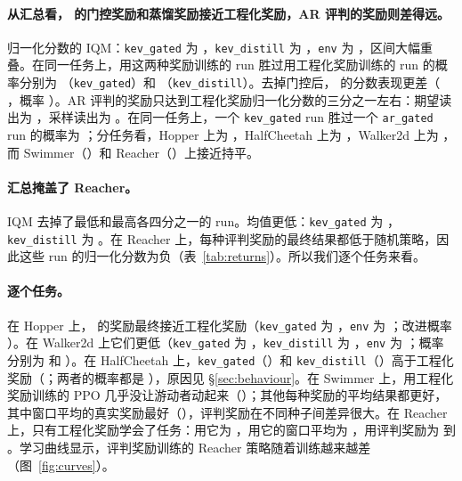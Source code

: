 \paragraph{从汇总看，\kev{} 的门控奖励和蒸馏奖励接近工程化奖励，AR 评判的奖励则差得远。} 归一化分数的 IQM：\texttt{kev\_gated} 为  ，\texttt{kev\_distill} 为  ，\texttt{env} 为  ，区间大幅重叠。在同一任务上，用这两种奖励训练的 run 胜过用工程化奖励训练的 run 的概率分别为 （\texttt{kev\_gated}）和 （\texttt{kev\_distill}）。去掉门控后，\kev{} 的分数表现更差（ ，概率 ）。AR 评判的奖励只达到工程化奖励归一化分数的三分之一左右：期望读出为  ，采样读出为  。在同一任务上，一个 \texttt{kev\_gated} run 胜过一个 \texttt{ar\_gated} run 的概率为 ；分任务看，Hopper 上为 ，HalfCheetah 上为 ，Walker2d 上为 ，而 Swimmer（）和 Reacher（）上接近持平。

\paragraph{汇总掩盖了 Reacher。} IQM 去掉了最低和最高各四分之一的 run。均值更低：\texttt{kev\_gated} 为 ，\texttt{kev\_distill} 为 。在 Reacher 上，每种评判奖励的最终结果都低于随机策略，因此这些 run 的归一化分数为负（表~\ref{tab:returns}）。所以我们逐个任务来看。

\paragraph{逐个任务。} 在 Hopper 上，\kev{} 的奖励最终接近工程化奖励（\texttt{kev\_gated} 为 ，\texttt{env} 为 ；改进概率 ）。在 Walker2d 上它们更低（\texttt{kev\_gated} 为 ，\texttt{kev\_distill} 为 ，\texttt{env} 为 ；概率分别为  和 ）。在 HalfCheetah 上，\texttt{kev\_gated}（）和 \texttt{kev\_distill}（）高于工程化奖励（；两者的概率都是 ），原因见 \S\ref{sec:behaviour}。在 Swimmer 上，用工程化奖励训练的 PPO 几乎没让游动者动起来（）；其他每种奖励的平均结果都更好，其中窗口平均的真实奖励最好（），评判奖励在不同种子间差异很大。在 Reacher 上，只有工程化奖励学会了任务：用它为 ，用它的窗口平均为 ，用评判奖励为  到 。学习曲线显示，评判奖励训练的 Reacher 策略随着训练越来越差（图~\ref{fig:curves}）。

